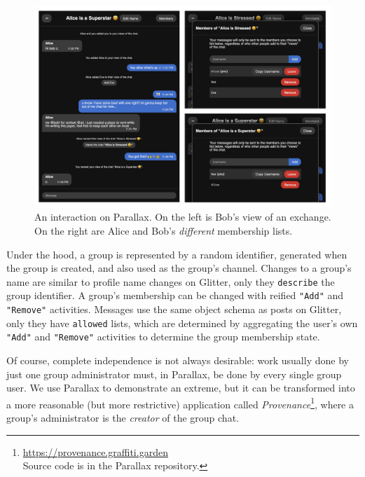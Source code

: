 \begin{figure}[h]
    \centering
    \includegraphics[width=\textwidth]{paper/figures/parallax.png}
    \caption{An interaction on Parallax. On the left is Bob's view of an exchange. On the right are Alice and Bob's \emph{different} membership lists.}

    \label{case-studies:fig:parallax}
\end{figure}

Under the hood, a group is represented by a random identifier,
generated when the group is created, and also used as the group's channel.
Changes to a group's name are similar to profile name changes on Glitter, only they
\texttt{describe} the group identifier.
A group's membership can be changed with reified \texttt{"Add"}
and \texttt{"Remove"} activities.
Messages use the same object schema as posts on Glitter,
only they have \texttt{allowed} lists, which are determined
by aggregating the user's own \texttt{"Add"} and \texttt{"Remove"} activities
to determine the group membership state.

Of course, complete independence is not always desirable:
work usually done by just one group administrator must, in Parallax,
be done by every single group user.
We use Parallax to demonstrate an extreme,
but it can be
transformed into a more reasonable (but more restrictive) application called \emph{Provenance}\footnote{
\url{https://provenance.graffiti.garden}\\Source code is in the Parallax repository.
},
where a group's administrator is the  \emph{creator} of the group chat.

